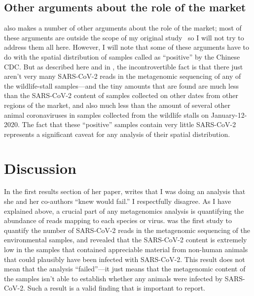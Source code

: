 \documentclass[9pt,twocolumn,twoside]{gsajnl_modified}
\begin{document}
\subsection{Other arguments about the role of the market}
\citet{debarre2024what} also makes a number of other arguments about the role of the market; most of these arguments are outside the scope of my original study~\citep{bloom2023association} so I will not try to address them all here.
However, I will note that some of these arguments have to do with the spatial distribution of samples called as ``positive'' by the Chinese CDC.
But as described here and in \citet{bloom2023association}, the incontrovertible fact is that there just aren't very many SARS-CoV-2 reads in the metagenomic sequencing of any of the wildlife-stall samples---and the tiny amounts that are found are much less than the SARS-CoV-2 content of samples collected on other dates from other regions of the market, and also much less than the amount of several other animal coronaviruses in samples collected from the wildlife stalls on January-12-2020.
The fact that these ``positive'' samples contain very little SARS-CoV-2 represents a significant caveat for any analysis of their spatial distribution.

\section{Discussion}

In the first results section of her paper, \citet{debarre2024what} writes that I was doing an analysis that she and her co-authors ``knew would fail.''
I respectfully disagree.
As I have explained above, a crucial part of any metagenomics analysis is quantifying the abundance of reads mapping to each species or virus.
\citet{bloom2023association} was the first study to quantify the number of SARS-CoV-2 reads in the metagenomic sequencing of the environmental samples, and revealed that the SARS-CoV-2 content is extremely low in the samples that contained appreciable material from non-human animals that could plausibly have been infected with SARS-CoV-2.
This result does not mean that the analysis ``failed''---it just means that the metagenomic content of the samples isn't able to establish whether any animals were infected by SARS-CoV-2.
Such a result is a valid finding that is important to report.
\end{document}
